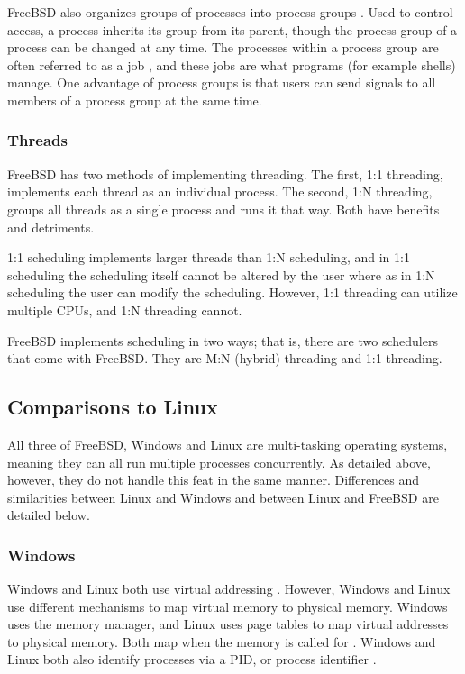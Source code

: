 \documentclass[10pt,draftclsnofoot,onecolumn,compsoc]{IEEEtran}
\begin{document}
	FreeBSD also organizes groups of processes into process groups \cite{BSD}. Used to control access, a process inherits its group from its parent, though the process group of a process can be changed at any time. The processes within a process group are often referred to as a job \cite{BSD}, and these jobs are what programs (for example shells) manage. One advantage of process groups is that users can send signals to all members of a process group at the same time.
	
	\subsubsection{Threads}

	FreeBSD has two methods of implementing threading. The first, 1:1 threading, implements each thread as an individual process. The second, 1:N threading, groups all threads as a single process and runs it that way. Both have benefits and detriments. \cite{bsdsched}
	
	1:1 scheduling implements larger threads than 1:N scheduling, and in 1:1 scheduling the scheduling itself cannot be altered by the user where as in 1:N scheduling the user can modify the scheduling. However, 1:1 threading can utilize multiple CPUs, and 1:N threading cannot. \cite{bsdsched}
	
	FreeBSD implements scheduling in two ways; that is, there are two schedulers that come with FreeBSD. They are M:N (hybrid) threading and 1:1 threading. \cite{bsdsched} 
	

	\subsection{Comparisons to Linux}
	
	All three of FreeBSD, Windows and Linux are multi-tasking operating systems, meaning they can all run multiple processes concurrently. As detailed above, however, they do not handle this feat in the same manner. Differences and similarities between Linux and Windows and between Linux and FreeBSD are detailed below.
	
	\subsubsection{Windows}
	
	Windows and Linux both use virtual addressing \cite{kernel} \cite{msdnvirt}. However, Windows and Linux use different mechanisms to map virtual memory to physical memory. Windows uses the memory manager, and Linux uses page tables to map virtual addresses to physical memory. Both map when the memory is called for \cite{WInternals} \cite{Kevin}. Windows and Linux both also identify processes via a PID, or process identifier \cite{WInternals}.
	
\end{document}
